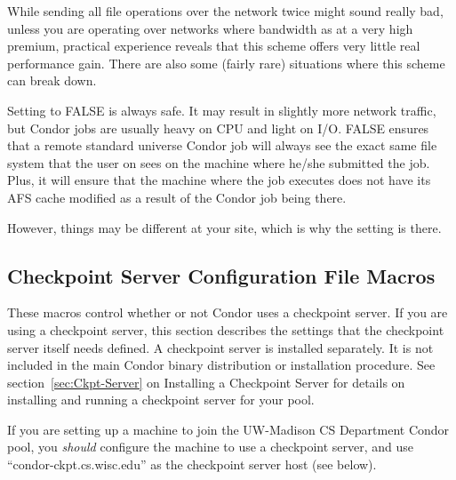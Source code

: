 \begin{description}
  While sending all file operations over the network twice might sound
  really bad, unless you are operating over networks where bandwidth
  as at a very high premium, practical experience reveals that this
  scheme offers very little real performance gain.  There are also
  some (fairly rare) situations where this scheme can break down.
  
  Setting  to FALSE is always safe.  It may result
  in slightly more network traffic, but Condor jobs are usually heavy
  on CPU and light on I/O.  FALSE ensures that a remote
  standard universe Condor job will always see the exact same
  file system that the user on sees on the machine where he/she
  submitted the job.  Plus, it will ensure that the machine where the
  job executes does not have its AFS cache modified as a result of
  the Condor job being there.  
  
  However, things may be different at your site, which is why the
  setting is there.

\end{description}

\subsection{\label{Checkpoint-Server-Config-File-Entries}
Checkpoint Server Configuration File Macros}

These macros control whether or not Condor uses a checkpoint server.
If you are using a checkpoint server, this section
describes the settings that the checkpoint server itself needs
defined.  A checkpoint server is installed
separately. It is not included in the main Condor binary
distribution or installation procedure.  See
section~\ref{sec:Ckpt-Server} on Installing a Checkpoint Server
for details on installing and running a checkpoint server for your
pool.

\Note If you are setting up a machine to join the UW-Madison CS
Department Condor pool, you \emph{should} configure the machine to
use a checkpoint server, and use ``condor-ckpt.cs.wisc.edu'' as the
checkpoint server host (see below).

